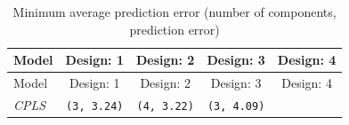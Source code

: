 \documentclass[12pt,A4paper,authoryear]{elsarticle} %
\theoremstyle{definition}
\theoremstyle{definition}
\theoremstyle{remark}
\begin{document}
\begin{longtable}[]{@{}lcccc@{}}
\caption{\label{tab:min-error} Minimum average prediction error (number of
components, prediction error)}\tabularnewline
\toprule
\begin{minipage}[b]{0.09\columnwidth}\raggedright\strut
Model\strut
\end{minipage} & \begin{minipage}[b]{0.19\columnwidth}\centering\strut
Design: 1\strut
\end{minipage} & \begin{minipage}[b]{0.19\columnwidth}\centering\strut
Design: 2\strut
\end{minipage} & \begin{minipage}[b]{0.19\columnwidth}\centering\strut
Design: 3\strut
\end{minipage} & \begin{minipage}[b]{0.19\columnwidth}\centering\strut
Design: 4\strut
\end{minipage}\tabularnewline
\midrule
\endfirsthead
\toprule
\begin{minipage}[b]{0.09\columnwidth}\raggedright\strut
Model\strut
\end{minipage} & \begin{minipage}[b]{0.19\columnwidth}\centering\strut
Design: 1\strut
\end{minipage} & \begin{minipage}[b]{0.19\columnwidth}\centering\strut
Design: 2\strut
\end{minipage} & \begin{minipage}[b]{0.19\columnwidth}\centering\strut
Design: 3\strut
\end{minipage} & \begin{minipage}[b]{0.19\columnwidth}\centering\strut
Design: 4\strut
\end{minipage}\tabularnewline
\midrule
\endhead
\begin{minipage}[t]{0.09\columnwidth}\raggedright\strut
\emph{CPLS}\strut
\end{minipage} & \begin{minipage}[t]{0.19\columnwidth}\centering\strut
\texttt{(3,\ 3.24)}\strut
\end{minipage} & \begin{minipage}[t]{0.19\columnwidth}\centering\strut
\texttt{(4,\ 3.22)}\strut
\end{minipage} & \begin{minipage}[t]{0.19\columnwidth}\centering\strut
\texttt{(3,\ 4.09)}\strut
\end{minipage} & \begin{minipage}[t]{0.19\columnwidth}\centering\strut

\end{minipage}
\end{longtable}
\end{document}
